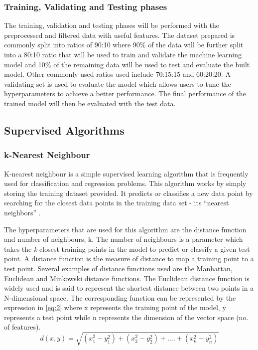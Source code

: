 \subsubsection{Training, Validating and Testing phases}
The training, validation and testing phases will be performed with the preprocessed and filtered data with useful features. The dataset prepared is commonly split into ratios of 90:10 where 90\% of the data will be further split into a 80:10 ratio that will be used to train and validate the machine learning model and 10\% of the remaining data will be used to test and evaluate the built model. Other commonly used ratios used include 70:15:15 and 60:20:20. A validating set is used to evaluate the model which allows users to tune the hyperparameters to achieve a better performance. The final performance of the trained model will then be evaluated with the test data. 
\subsection{Supervised Algorithms}

\subsubsection{k-Nearest Neighbour}
K-nearest neighbour is a simple supervised learning algorithm that is frequently used for classification and regression problems. This algorithm works by simply storing the training dataset provided. It predicts or classifies a new data point by searching for the closest data points in the training data set - its ``nearest neighbors'' \cite{muller_guido_2016}.

The hyperparameters that are used for this algorithm are the distance function and number of neighbours, k. The number of neighbours is a parameter which takes the \textit{k} closest training points in the model to predict or classify a given test point. A distance function is the measure of distance to map a training point to a test point. Several examples of distance functions used are the Manhattan, Euclidean and Minkowski distance functions. The Euclidean distance function is widely used and is said to represent the shortest distance between two points in a N-dimensional space. The corresponding function can be represented by the expression in 
\ref{eq:2} \cite{knn} where x represents the training point of the model, y represents a test point while n represents the dimension of the vector space (no. of features). 
\begin{equation}
    d(x,y) = \sqrt{(x_1^2-y_1^2)+(x_2^2-y_2^2)+....+(x_n^2-y_n^2)} \label{eq:2}
\end{equation}


